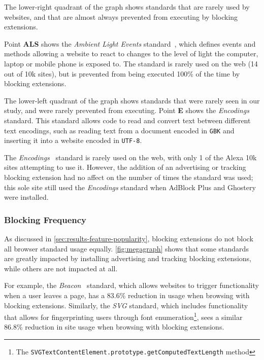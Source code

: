 The lower-right quadrant of the graph shows standards that are rarely used by
websites, and that are almost always prevented from executing by blocking
extensions.

Point \textbf{ALS} shows the \textit{Ambient Light Events}
standard~\cite{ambientlightapi}, which defines events and methods allowing a
website to react to changes to the level of light the computer, laptop or
mobile phone is exposed to.  The standard is rarely used on the web (14 out of
10k sites), but is prevented from being executed 100\% of the time by blocking
extensions.

The lower-left quadrant of the graph shows standards that were rarely seen in
our study, and were rarely prevented from executing.  Point \textbf{E} shows
the \textit{Encodings}~\cite{encodingw3c} standard.  This standard allows \JS
code to read and convert text between different text encodings, such as reading
text from a document encoded in \texttt{GBK} and inserting it into a website
encoded in \texttt{UTF-8}.

The \textit{Encodings}~\cite{encodingw3c} standard is rarely used on the web,
with only 1 of the Alexa 10k sites attempting to use it.  However, the addition
of an advertising or tracking blocking extension had no affect on the number of
times the standard was used; this sole site still used the \textit{Encodings}
standard when AdBlock Plus and Ghostery were installed.


\subsubsection{Blocking Frequency}
As discussed in \ref{sec:results-feature-popularity}, blocking extensions do
not block all browser standard usage equally. \ref{fig:megagraph}
shows that some standards are greatly impacted by installing advertising and
tracking blocking extensions, while others are not impacted at all.

For example, the \textit{Beacon}~\cite{beaconapi} standard, which allows
websites to trigger functionality when a user leaves a page, has a 83.6\%
reduction in usage when browsing with blocking extensions.  Similarly, the
\textit{SVG} standard, which includes functionality that allows for
fingerprinting users through font enumeration\footnote{The
\texttt{SVGTextContentElement.prototype.getComputedTextLength} method}, sees a
similar 86.8\% reduction in site usage when browsing with blocking extensions.

